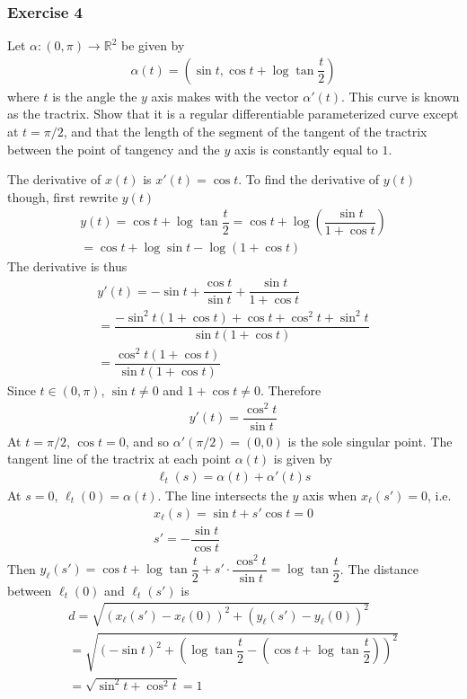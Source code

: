 \documentclass{article}
\newcommand{\R}{\mathbb{R}}
\begin{document}
	\subsubsection*{Exercise 4}
	Let $\alpha \colon (0, \pi) \to \R^2$ be given by
	\begin{gather*}
		\alpha(t) = \left( \sin t, \cos t + \log \tan \dfrac{t}{2} \right)
	\end{gather*}
	where $t$ is the angle the $y$ axis makes with the vector $\alpha'(t)$. This curve is known as the tractrix. Show that it is a regular differentiable parameterized curve except at $t = \pi/2$, and that the length of the segment of the tangent of the tractrix between the point of tangency and the $y$ axis is constantly equal to $1$.
	
	The derivative of $x(t)$ is $x'(t) = \cos t$. To find the derivative of $y(t)$ though, first rewrite $y(t)$
	\begin{gather*}
		y(t) = \cos t + \log \tan \dfrac{t}{2} = \cos t + \log \left( \dfrac{\sin t}{1 + \cos t} \right) \\
		= \cos t + \log \sin t - \log \left( 1 + \cos t \right)
	\end{gather*}
	The derivative is thus
	\begin{gather*}
		y'(t) = - \sin t + \dfrac{\cos t}{\sin t} + \dfrac{\sin t}{1 + \cos t} \\
		= \dfrac{-\sin^2 t (1 + \cos t) + \cos t + \cos^2 t  + \sin^2 t}{\sin t (1 + \cos t)} \\
		= \dfrac{\cos^2 t (1 + \cos t)}{\sin t (1 + \cos t)}
	\end{gather*}
	Since $t \in (0, \pi)$, $\sin t \neq 0$ and $1 + \cos t \neq 0$. Therefore
	\begin{gather*}
		y'(t) = \dfrac{\cos^2 t}{\sin t}
	\end{gather*}
	At $t = \pi/2$, $\cos t = 0$, and so $\alpha'(\pi/2) = (0, 0)$ is the sole singular point. The tangent line of the tractrix at each point $\alpha(t)$ is given by
	\begin{gather*}
		\ell_t(s) = \alpha(t) + \alpha'(t) s
	\end{gather*}
	At $s = 0$, $\ell_t(0) = \alpha(t)$. The line intersects the $y$ axis when $x_{\ell}(s') = 0$, i.e.
	\begin{gather*}
		x_{\ell}(s) = \sin t + s' \cos t = 0 \\
		s' = - \dfrac{\sin t}{\cos t}
	\end{gather*}
	Then $y_{\ell}(s') = \cos t + \log \tan \dfrac{t}{2} + s' \cdot \dfrac{\cos^2 t}{\sin t} = \log \tan \dfrac{t}{2}$. The distance between $\ell_t(0)$ and $\ell_t(s')$ is
	\begin{gather*}
		d = \sqrt{\left( x_{\ell}(s') - x_{\ell}(0) \right)^2 + \left( y_{\ell}(s') - y_{\ell}(0) \right)^2} \\
		= \sqrt{ \left( -\sin t \right)^2 + \left( \log \tan \dfrac{t}{2} - \left( \cos t + \log \tan \dfrac{t}{2} \right) \right)^2 } \\
		= \sqrt{ \sin^2 t + \cos^2 t} = 1
	\end{gather*}
	
\end{document}
